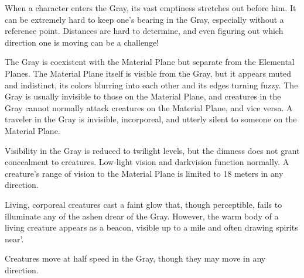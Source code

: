 When a character enters the Gray, its vast emptiness stretches out before him. It can be extremely hard to keep one's bearing in the Gray, especially without a reference point. Distances are hard to determine, and even figuring out which direction one is moving can be a challenge!

The Gray is coexistent with the Material Plane but separate from the Elemental Planes. The Material Plane itself is visible from the Gray, but it appears muted and indistinct, its colors blurring into each other and its edges turning fuzzy. The Gray is usually invisible to those on the Material Plane, and creatures in the Gray cannot normally attack creatures on the Material Plane, and vice versa. A traveler in the Gray is invisible, incorporeal, and utterly silent to someone on the Material Plane.

Visibility in the Gray is reduced to twilight levels, but the dimness does not grant concealment to creatures. Low-light vision and darkvision function normally. A creature's range of vision to the Material Plane is limited to 18 meters in any direction. %

Living, corporeal creatures cast a faint glow that, though perceptible, fails to illuminate any of the ashen drear of the Gray. However, the warm body of a living creature appears as a beacon, visible up to a mile and often drawing spirits near'.

Creatures move at half speed in the Gray, though they may move in any direction.

